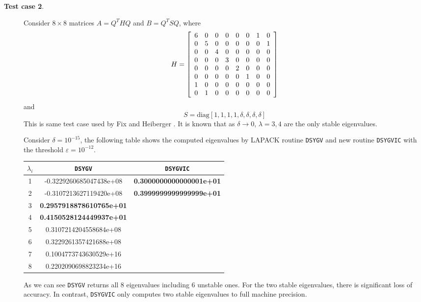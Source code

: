 \documentclass[11pt]{article}
\begin{document}
\begin{description}
\item[{\bf Test case 2}.] 
Consider $8 \times 8$ matrices $A=Q^THQ$ and $B = Q^TSQ$, where 
\[
H=\left[\begin{array}{c c c c c c c c}
6 & 0 & 0 & 0 & 0 & 0 & 1 & 0 \\
0 & 5 & 0 & 0 & 0 & 0 & 0 & 1 \\
0 & 0 & 4 & 0 & 0 & 0 & 0 & 0 \\
0 & 0 & 0 & 3 & 0 & 0 & 0 & 0 \\
0 & 0 & 0 & 0 & 2 & 0 & 0 & 0 \\
0 & 0 & 0 & 0 & 0 & 1 & 0 & 0 \\
1 & 0 & 0 & 0 & 0 & 0 & 0 & 0 \\
0 & 1 & 0 & 0 & 0 & 0 & 0 & 0 \\
\end{array}\right]
\]
and
\[
S=\mbox{diag}[1,1,1,1,\delta,\delta,\delta,\delta]
\]
This is same test case used by Fix and Heiberger \cite{fix1972algorithm}.
It is known that as $\delta \rightarrow 0$, $\lambda=3,4$ are the only 
stable eigenvalues.

Consider $\delta=10^{-15}$,
the following table shows the computed eigenvalues by 
LAPACK routine {\tt DSYGV} and new routine 
{\tt DSYGVIC} with the threshold $\varepsilon=10^{-12}$.
\begin{center}
\begin{tabular}{  c || c | c  }
$\lambda_i$  &   {\tt DSYGV}              & {\tt DSYGVIC} \\ \hline
1 &   -0.3229260685047438e+08  &  {\bf 0.3000000000000001e+01} \\
2 &   -0.3107213627119420e+08  &  {\bf 0.3999999999999999e+01} \\
3 &   {\bf 0.2957918878610765e+01}  & \\
4 &   {\bf 0.4150528124449937e+01}  & \\
5 &    0.3107214204558684e+08  & \\
6 &    0.3229261357421688e+08  & \\
7 &    0.1004773743630529e+16  & \\
8 &    0.2202090698823234e+16  & \\
  \end{tabular}
\end{center}
As we can see {\tt DSYGV} returns all 8 eigenvalues including 
6 unstable ones. For the two stable eigenvalues, there is significant
loss of accuracy. In contrast, {\tt DSYGVIC} only computes 
two stable eigenvalues to full machine precision. 


\end{description}
\end{document}
